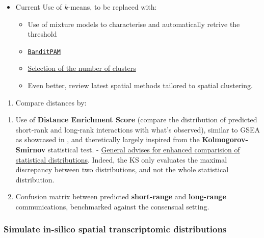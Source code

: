 \documentclass[
  letterpaper,
]{book}
\providecommand{\tightlist}{%
  \setlength{\itemsep}{0pt}\setlength{\parskip}{0pt}}\usepackage{longtable,booktabs,array}
\begin{document}
\begin{itemize}
\tightlist
\item
  Current Use of \(k\)-means, to be replaced with:

  \begin{itemize}
  \tightlist
  \item
    Use of mixture models to characterise and automatically retrive the
    threshold
  \item
    \href{https://www.linkedin.com/posts/vlevorato_machinelearning-datascience-unsupervised-activity-7289567831145279490-Ibchs}{\texttt{BanditPAM}}
  \item
    \href{https://www.linkedin.com/posts/vlevorato_datascience-machinelearning-unsupervised-activity-7292093235366121472-jMMg}{Selection
    of the number of clusters}
  \item
    Even better, review latest spatial methods tailored to spatial
    clustering.
  \end{itemize}
\end{itemize}

\begin{enumerate}
\def\labelenumi{\arabic{enumi}.}
\setcounter{enumi}{1}
\tightlist
\item
  Compare distances by:
\end{enumerate}

\begin{enumerate}
\def\labelenumi{\roman{enumi}.}
\tightlist
\item
  Use of \textbf{Distance Enrichment Score} (compare the distribution of
  predicted short-rank and long-rank interactions with what's observed),
  similar to GSEA as showcased in \autocite{subramanian2005pnas}, and
  theretically largely inspired from the \textbf{Kolmogorov-Smirnov}
  statistical test. -
  \href{https://www.linkedin.com/posts/adrianolszewski_statistics-datascience-activity-7256312446737387520-J8zk}{General
  advises for enhanced comparision of statistical distributions}.
  Indeed, the KS only evaluates the maximal discrepancy between two
  distributions, and not the whole statistical distribution.\\
\item
  Confusion matrix between predicted \textbf{short-range} and
  \textbf{long-range} communications, benchmarked against the consensual
  setting.
\end{enumerate}

\subsubsection{Simulate in-silico spatial transcriptomic
distributions}\label{simulate-in-silico-spatial-transcriptomic-distributions}
\end{document}
